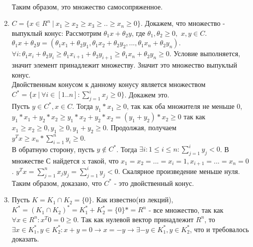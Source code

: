 \documentclass[12pt]{extreport}
\theoremstyle{definiton}
\theoremstyle{definition}
\theoremstyle{definition}
\let\leq\leqslant
\let\geq\geqslant
\def\prend{
	\medskip
}
\begin{document}
\begin{enumerate}
	        \\ Таким образом, это множество самосопряженное.
	        \item $C = \{x \in R^n\ |\ x_1\geq x_2 \geq x_3 \geq .. \geq x_n \geq 0\}$. Докажем, что множество - выпуклый конус: Рассмотрим $\theta_1 x + \theta_2 y$, где $\theta_1, \theta_2 \geq 0,$ $x,y \in C$. $\theta_1 x + \theta_2 y = (\theta_1 x_1 + \theta_2 y_1, \theta_1 x_2 + \theta_2 y_2, ..., \theta_1 x_n + \theta_2 y_n)$. $\forall i: \theta_1 x_i + \theta_2 y_i \geq \theta_1 x_{i+1} + \theta_2 y_{i+1} \geq \theta_1 x_{n} + \theta_2 y_{n} \geq 0 $. Условие выполняется, значит элемент принадлежит множеству. Значит это множество выпуклый конус.
	        \\Двойственным конусом к данному конусу является множеством $C^* = \{x\ |\ \forall i \in [1..n]: \sum_{j=1}^{i} x_j\geq 0\}$. Докажем это. 
	        \\ Пусть $y \in C^*, x \in C$. Тогда $y_1*x_1 \geq 0$, так как оба множителя не меньше 0, $y_1*x_1 + y_2*x_2 \geq y_1*x_2 + y_2*x_2 = (y_1 + y_2)*x_2 \geq 0$ так как $x_1 \geq x_2 \geq 0, y_1 \geq 0, y_1+y_2 \geq 0$. Продолжая, получаем $y^Tx \geq x_n*\sum_{i=1}^{n}y_i \geq 0$. 
	        \\ В обратную сторону, пусть $y \notin C^*$. Тогда $\exists i: 1 \leq i \leq n: \sum_{j=1}^{i} y_j < 0$. В множестве С найдется x такой, что $x_1=x_2=...=x_i=1, x_{i+1}=...=x_n=0$. $y^Tx = \sum_{j=1}^{n}x_jy_j=\sum_{j=1}^{i}y_j<0$. Скалярное произведение меньше нуля.
	        \\Таким образом, доказано, что $C^*$ - это двойственный конус.
	        \item Пусть $K = K_1 \cap K_2 = \{0\}$. Как известно(из лекций), $K^* = (K_1 \cap K_2)^*= K_{1}^* + K_{2}^* = \{0\}* = R^n$ - все множество, так как $\forall x \in R^n: x^T0 = 0 \geq 0$. Так как нулевой вектор принадлежит $R^n$, то $\exists x \in K_{1}^*, y \in K_{2}^*: x + y = 0 \to x = -y \to \exists -y \in K_{1}^*, y \in K_{2}^*$, что и требовалось доказать.
	    \end{enumerate}
	\prend
\end{document}
